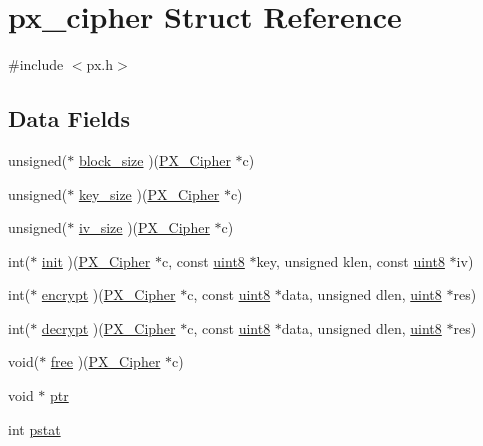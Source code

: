 \hypertarget{structpx__cipher}{\section{px\-\_\-cipher Struct Reference}
\label{structpx__cipher}
}


{\ttfamily \#include $<$px.\-h$>$}

\subsection*{Data Fields}
\begin{DoxyCompactItemize}
\item 
unsigned($\ast$ \hyperlink{structpx__cipher_ae07f901d28bee73ac010f9cf5e0b5542}{block\-\_\-size} )(\hyperlink{px_8h_a971b71d1dd84736bdccbc92805c3d018}{P\-X\-\_\-\-Cipher} $\ast$c)
\item 
unsigned($\ast$ \hyperlink{structpx__cipher_abb0e876a446ea3b60312600756c84ba4}{key\-\_\-size} )(\hyperlink{px_8h_a971b71d1dd84736bdccbc92805c3d018}{P\-X\-\_\-\-Cipher} $\ast$c)
\item 
unsigned($\ast$ \hyperlink{structpx__cipher_a17865fc83c08e2ec6489bf2ed50230ca}{iv\-\_\-size} )(\hyperlink{px_8h_a971b71d1dd84736bdccbc92805c3d018}{P\-X\-\_\-\-Cipher} $\ast$c)
\item 
int($\ast$ \hyperlink{structpx__cipher_a4cc09030530e02a60c81374336ab8cc8}{init} )(\hyperlink{px_8h_a971b71d1dd84736bdccbc92805c3d018}{P\-X\-\_\-\-Cipher} $\ast$c, const \hyperlink{c_8h_adde6aaee8457bee49c2a92621fe22b79}{uint8} $\ast$key, unsigned klen, const \hyperlink{c_8h_adde6aaee8457bee49c2a92621fe22b79}{uint8} $\ast$iv)
\item 
int($\ast$ \hyperlink{structpx__cipher_a32ab97af8bda85fbf58ac89a33ca831f}{encrypt} )(\hyperlink{px_8h_a971b71d1dd84736bdccbc92805c3d018}{P\-X\-\_\-\-Cipher} $\ast$c, const \hyperlink{c_8h_adde6aaee8457bee49c2a92621fe22b79}{uint8} $\ast$data, unsigned dlen, \hyperlink{c_8h_adde6aaee8457bee49c2a92621fe22b79}{uint8} $\ast$res)
\item 
int($\ast$ \hyperlink{structpx__cipher_a6d3313430da30c4bc1dd2759aa5828e1}{decrypt} )(\hyperlink{px_8h_a971b71d1dd84736bdccbc92805c3d018}{P\-X\-\_\-\-Cipher} $\ast$c, const \hyperlink{c_8h_adde6aaee8457bee49c2a92621fe22b79}{uint8} $\ast$data, unsigned dlen, \hyperlink{c_8h_adde6aaee8457bee49c2a92621fe22b79}{uint8} $\ast$res)
\item 
void($\ast$ \hyperlink{structpx__cipher_a3de791a8214f3fbc31ed6dde380482ff}{free} )(\hyperlink{px_8h_a971b71d1dd84736bdccbc92805c3d018}{P\-X\-\_\-\-Cipher} $\ast$c)
\item 
void $\ast$ \hyperlink{structpx__cipher_a73945c5645b030ef56f93619fd054fb4}{ptr}
\item 
int \hyperlink{structpx__cipher_a38cb7dae8989ea328c191c73d91f6c31}{pstat}
\end{DoxyCompactItemize}


